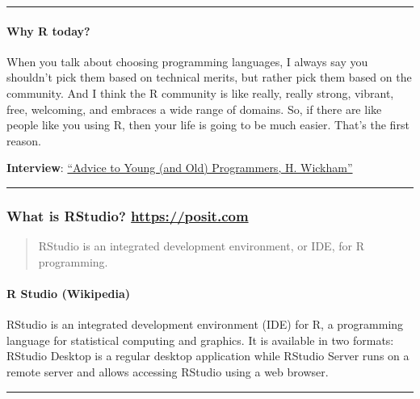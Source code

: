 \documentclass[
]{article}
\begin{document}
\begin{center}\rule{0.5\linewidth}{0.5pt}\end{center}

\hypertarget{why-r-today}{%
\paragraph{Why R today?}\label{why-r-today}}

When you talk about choosing programming languages, I always say you
shouldn't pick them based on technical merits, but rather pick them
based on the community. And I think the R community is like really,
really strong, vibrant, free, welcoming, and embraces a wide range of
domains. So, if there are like people like you using R, then your life
is going to be much easier. That's the first reason.

\textbf{Interview}:
\href{https://www.r-bloggers.com/2018/08/advice-to-young-and-old-programmers-a-conversation-with-hadley-wickham/}{``Advice
to Young (and Old) Programmers, H. Wickham''}

\begin{center}\rule{0.5\linewidth}{0.5pt}\end{center}

\hypertarget{what-is-rstudio-httpsposit.com}{%
\subsubsection{\texorpdfstring{What is RStudio?
\url{https://posit.com}}{What is RStudio? https://posit.com}}\label{what-is-rstudio-httpsposit.com}}

\begin{quote}
RStudio is an integrated development environment, or IDE, for R
programming.
\end{quote}

\hypertarget{r-studio-wikipedia}{%
\paragraph{R Studio (Wikipedia)}\label{r-studio-wikipedia}}

RStudio is an integrated development environment (IDE) for R, a
programming language for statistical computing and graphics. It is
available in two formats: RStudio Desktop is a regular desktop
application while RStudio Server runs on a remote server and allows
accessing RStudio using a web browser.

\begin{center}\rule{0.5\linewidth}{0.5pt}\end{center}
\end{document}
